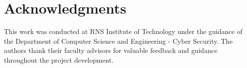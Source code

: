 \documentclass[conference]{IEEEtran}
\begin{document}
\section*{Acknowledgments}
This work was conducted at RNS Institute of Technology under the guidance of the Department of Computer Science and Engineering - Cyber Security. The authors thank their faculty advisors for valuable feedback and guidance throughout the project development.



\end{document}
